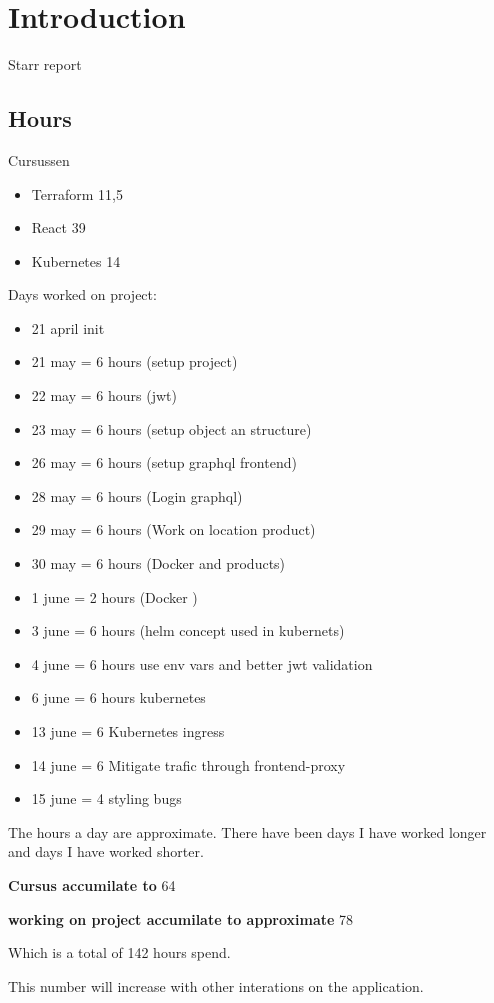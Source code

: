 \section{Introduction}
Starr report

\subsection{Hours}

Cursussen
\begin{itemize}
	\item Terraform 11,5
	\item React 39
	\item Kubernetes 14
\end{itemize}

Days worked on project:

\begin{itemize}
\item 21 april init 
\item 21 may = 6 hours (setup project) 
\item 22 may = 6 hours (jwt) 
\item 23 may = 6 hours (setup object an structure) 
\item 26 may = 6 hours (setup graphql frontend) 
\item 28 may = 6 hours (Login graphql) 
\item 29 may = 6 hours (Work on location product) 
\item 30 may = 6 hours (Docker and products) 
\item 1 june = 2 hours (Docker ) 
\item 3 june = 6 hours (helm concept used in kubernets) 
\item 4 june = 6 hours use env vars and better jwt validation 
\item 6 june = 6 hours kubernetes 
\item 13 june = 6 Kubernetes ingress 
\item 14 june = 6 Mitigate trafic through frontend-proxy 
\item 15 june = 4 styling bugs 
\end{itemize}



The hours a day are approximate.
There have been days I have worked longer and days I have worked shorter.


\textbf{Cursus accumilate to}  64

\textbf{working on project accumilate to approximate} 78


Which is a total of 142 hours spend.

This number will increase with other interations on the application.
